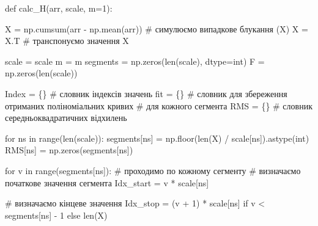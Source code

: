 \documentclass[
  letterpaper,
]{report}
\newenvironment{Shaded}{\begin{snugshade}}{\end{snugshade}}
\newcommand{\BuiltInTok}[1]{\textcolor[rgb]{0.00,0.23,0.31}{#1}}
\newcommand{\CommentTok}[1]{\textcolor[rgb]{0.37,0.37,0.37}{#1}}
\newcommand{\ControlFlowTok}[1]{\textcolor[rgb]{0.00,0.23,0.31}{#1}}
\newcommand{\DecValTok}[1]{\textcolor[rgb]{0.68,0.00,0.00}{#1}}
\newcommand{\KeywordTok}[1]{\textcolor[rgb]{0.00,0.23,0.31}{#1}}
\newcommand{\NormalTok}[1]{\textcolor[rgb]{0.00,0.23,0.31}{#1}}
\newcommand{\OperatorTok}[1]{\textcolor[rgb]{0.37,0.37,0.37}{#1}}
\begin{document}
\begin{Shaded}
\begin{Highlighting}[]
\KeywordTok{def}\NormalTok{ calc\_H(arr, scale, m}\OperatorTok{=}\DecValTok{1}\NormalTok{):}
    
\NormalTok{    X }\OperatorTok{=}\NormalTok{ np.cumsum(arr }\OperatorTok{{-}}\NormalTok{ np.mean(arr)) }\CommentTok{\# симулюємо випадкове блукання (X)}
\NormalTok{    X }\OperatorTok{=}\NormalTok{ X.T                           }\CommentTok{\# транспонуємо значення X}

\NormalTok{    scale }\OperatorTok{=}\NormalTok{ scale}
\NormalTok{    m }\OperatorTok{=}\NormalTok{ m}
\NormalTok{    segments }\OperatorTok{=}\NormalTok{ np.zeros(}\BuiltInTok{len}\NormalTok{(scale), dtype}\OperatorTok{=}\BuiltInTok{int}\NormalTok{)}
\NormalTok{    F }\OperatorTok{=}\NormalTok{ np.zeros(}\BuiltInTok{len}\NormalTok{(scale))}

\NormalTok{    Index }\OperatorTok{=}\NormalTok{ \{\}  }\CommentTok{\# словник індексів значень}
\NormalTok{    fit }\OperatorTok{=}\NormalTok{ \{\}    }\CommentTok{\# словник для збереження отриманих поліноміальних кривих}
                \CommentTok{\# для кожного сегмента}
\NormalTok{    RMS }\OperatorTok{=}\NormalTok{ \{\}    }\CommentTok{\# словник середньоквадратичних відхилень}

    \ControlFlowTok{for}\NormalTok{ ns }\KeywordTok{in} \BuiltInTok{range}\NormalTok{(}\BuiltInTok{len}\NormalTok{(scale)):}
\NormalTok{        segments[ns] }\OperatorTok{=}\NormalTok{ np.floor(}\BuiltInTok{len}\NormalTok{(X) }\OperatorTok{/}\NormalTok{ scale[ns]).astype(}\BuiltInTok{int}\NormalTok{)}
\NormalTok{        RMS[ns] }\OperatorTok{=}\NormalTok{ np.zeros(segments[ns])}

        \ControlFlowTok{for}\NormalTok{ v }\KeywordTok{in} \BuiltInTok{range}\NormalTok{(segments[ns]):         }\CommentTok{\# проходимо по кожному сегменту}
            \CommentTok{\# визначаємо початкове значення сегмента}
\NormalTok{            Idx\_start }\OperatorTok{=}\NormalTok{ v }\OperatorTok{*}\NormalTok{ scale[ns]  }
                       
            \CommentTok{\# визначаємо кінцеве значення}
\NormalTok{            Idx\_stop }\OperatorTok{=}\NormalTok{ (v }\OperatorTok{+} \DecValTok{1}\NormalTok{) }\OperatorTok{*}\NormalTok{ scale[ns] }\ControlFlowTok{if}\NormalTok{ v }\OperatorTok{\textless{}}\NormalTok{ segments[ns] }\OperatorTok{{-}} \DecValTok{1} \ControlFlowTok{else} \BuiltInTok{len}\NormalTok{(X)    }
            

\end{Highlighting}
\end{Shaded}
\end{document}
